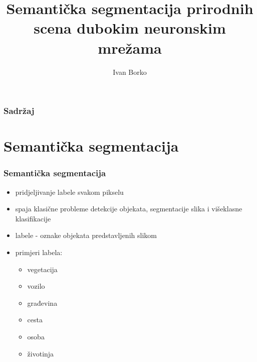 \documentclass[utf8]{beamer}
\title[Diplomski rad]{Semantička segmentacija prirodnih scena dubokim neuronskim mrežama}
\author{Ivan Borko} %
\institute[FER] %
{
Fakultet elektrotehnike i računarstva \\ %
\medskip
\textit{ivan.borko@fer.hr} %
}
\date{\displaydate{date}}
\begin{document}
\begin{frame}
\titlepage %
\end{frame}

\begin{frame}
\frametitle{Sadržaj} %
\tableofcontents %
\end{frame}


\section{Semantička segmentacija}

\begin{frame}
\frametitle{Semantička segmentacija}

\begin{itemize}
  \item pridjeljivanje labele svakom pikselu
  \item spaja klasične probleme detekcije objekata, segmentacije slika i višeklasne klasifikacije
  \item labele - oznake objekata predstavljenih slikom
  \item primjeri labela:
  \begin{itemize}
    \item vegetacija
    \item vozilo
    \item građevina
    \item cesta
    \item osoba
    \item životinja
  \end{itemize}
\end{itemize}

\end{frame}
\end{document}
